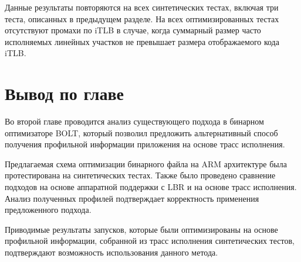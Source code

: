 Данные результаты повторяются на всех синтетических тестах, включая три теста, описанных в предыдущем разделе. На всех оптимизированных тестах отсутствуют промахи по iTLB в случае, когда суммарный размер часто исполняемых линейных участков не превышает размера отображаемого кода iTLB.

\section{Вывод по главе}\label{sec:ch2/sec7}
Во второй главе проводится анализ существующего подхода в бинарном оптимизаторе BOLT, который позволил предложить альтернативный способ получения профильной информации приложения на основе трасс исполнения.

Предлагаемая схема оптимизации бинарного файла на ARM архитектуре была протестирована на синтетических тестах.
\newpage
Также было проведено сравнение подходов на основе аппаратной поддержки с LBR и на основе трасс исполнения. Анализ полученных профилей подтверждает корректность применения предложенного подхода.

Приводимые результаты запусков, которые были оптимизированы на основе профильной информации, собранной из трасс исполнения синтетических тестов, подтверждают возможность использования данного метода.

\clearpage